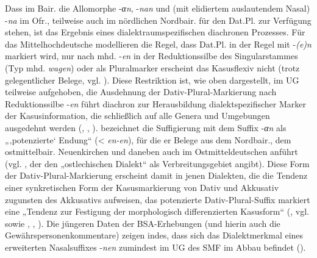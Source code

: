 Dass im Bair. die Allomorphe -\textit{αn}, -\textit{nan} und (mit elidiertem auslautendem Nasal) -\textit{na} im Ofr., teilweise auch im nördlichen Nordbair. für den Dat.Pl. zur Verfügung stehen, ist das Ergebnis eines dialektraumspezifischen diachronen Prozesses. Für das Mittelhochdeutsche modellieren \citet[125]{KleinEtAl2018} die Regel, dass Dat.Pl. in der Regel mit -\textit{(e)n} markiert wird, nur nach mhd. -\textit{en} in der Reduktionssilbe des Singularstammes (Typ mhd. \textit{wagen}) oder als Pluralmarker erscheint das Kasusflexiv nicht (trotz gelegentlicher Belege, vgl. \citealt[127--128]{KleinEtAl2018}). Diese Restriktion ist, wie oben dargestellt, im UG teilweise aufgehoben, die Ausdehnung der Dativ-Plural-Markierung nach Reduktionssilbe -\textit{en} führt diachron zur Herausbildung dialektspezifischer Marker der Kasusinformation, die schließlich auf alle Genera und Umgebungen ausgedehnt werden (\citealt[§285]{Gebhardt1907}, \citealt[§56]{Kollmer1985}, \citealt[§810]{Schmeller1821}). \citet[441--442]{Schirmunski1962} bezeichnet die Suffigierung mit dem Suffix -\textit{αn} als „‚potenzierte‘ Endung“ (< \textit{en-en}), für die er Belege aus dem Nordbair., dem ostmittelbair. Neuenkirchen und daneben auch im Ostmitteldeutschen anführt (vgl. \citealt[§863]{Schmeller1821}, der den „ostlechischen Dialekt“ als Verbreitungsgebiet angibt). Diese Form der Dativ-Plural-Markierung erscheint damit in jenen Dialekten, die die Tendenz einer synkretischen Form der Kasusmarkierung von Dativ und Akkusativ zugunsten des Akkusativs aufweisen, das potenzierte Dativ-Plural-Suffix markiert eine „Tendenz zur Festigung der morphologisch differenzierten Kasusform“ (\citealt[442]{Schirmunski1962}, vgl.  sowie \citealt[§145]{Kollmer1987}, \citealt[§20]{Micko-Repp1933}, \citealt[327--328]{Schiepek1908}). Die jüngeren Daten der BSA-Erhebungen (und hierin auch die Gewährspersonenkommentare) zeigen indes, dass sich das Dialektmerkmal eines erweiterten Nasalsuffixes {}-\textit{nen} zumindest im UG des SMF im Abbau befindet (\citealt[120]{SMF7}).

